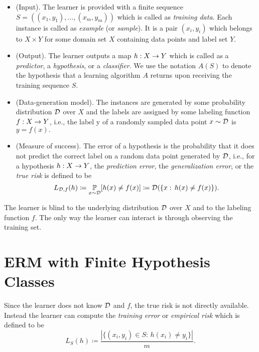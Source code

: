 \documentclass[11pt,a4paper]{article}
\begin{document}
\begin{itemize}
    \item {(Input).} The learner is provided with a finite sequence $S = ((x_1,y_1),\ldots,(x_m,y_m))$ which is called as \textit{training data}. Each instance is called as \textit{example} (or \textit{sample}). It is a pair $(x_i,y_i)$ which belongs to $X\times Y$ for some domain set $X$ containing data points and label set $Y$.
    \item {(Output).}  The learner outputs a map $h:X\rightarrow Y$ which is called as a \textit{predictor}, a \textit{hypothesis}, or a \textit{classifier}. We use the notation $A(S)$ to denote the hypothesis that a learning algorithm $A$ returns upon receiving the training sequence $S$.
    \item {(Data-generation model).} The instances are generated by some probability distribution $\mathcal{D}$ over $X$ and the labels are assigned by some labeling function $f:X\rightarrow Y$, i.e., the label y of a randomly sampled data point $x\sim \mathcal{D}$ is $y = f(x).$
    \item {(Measure of success).} The error of a hypothesis is the probability that it does not predict the correct label on a random data point generated by $\mathcal{D}$, i.e., for a hypothesis $h:X\rightarrow Y$, the \textit{prediction error}, the \textit{generalization error}, or the \textit{true risk} is defined to be
    \begin{equation}
    L_{\mathcal{D}, f}(h) \coloneqq \underset{x\sim \mathcal{D}}{\mathbb{P}} [h(x)\neq f(x)] \coloneqq \mathcal{D} (\{x:\,h(x)\neq f(x)\}).
    \end{equation}
\end{itemize}

\begin{remark}
The learner is blind to the underlying distribution $\mathcal{D}$ over $X$ and to the labeling function $f$. The only way the learner can interact is through observing the training set.
\end{remark}

\section{ERM with Finite Hypothesis Classes}

Since the learner does not know $\mathcal{D}$ and $f$, the true risk is not directly available. Instead the learner can compute the \textit{training error} or \textit{empirical risk} which is defined to be
\begin{equation}
L_S(h) \coloneqq \dfrac{|\{(x_i,y_i)\in S:\,h(x_i)\neq y_i\}|}{m}.
\end{equation}
\end{document}
